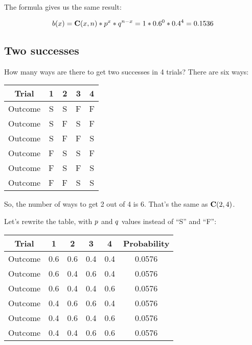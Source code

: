 \documentclass[../../../main.tex]{subfiles}
\begin{document}
The formula gives us the same result:

\begin{equation*}
  \Binom{\RandVarVal/} = \combs{\RandVarVal/}{n} * p^{\RandVarVal/} * q^{n - \RandVarVal/} = 1 * 0.6^{0} * 0.4^{4} = 0.1536
\end{equation*}


\subsection{Two successes}

How many ways are there to get two successes in 4 trials? There are six ways:

\begin{center}
  \begin{tabular}{| c | c | c | c | c |}
    \hline
    \textbf{Trial} & \textbf{1} & \textbf{2} & \textbf{3} & \textbf{4} \\ \hline
  Outcome & S & S & F & F \\ \hline
  Outcome & S & F & S & F \\ \hline
  Outcome & S & F & F & S \\ \hline
  Outcome & F & S & S & F \\ \hline
  Outcome & F & S & F & S \\ \hline
  Outcome & F & F & S & S \\ \hline
  \end{tabular}
\end{center}

\noindent
So, the number of ways to get 2 out of 4 is 6. That's the same as $\mathbf{C}(2, 4)$. 

Let's rewrite the table, with $\success/$ and $\failure/$ values instead of ``S'' and ``F'':

\begin{center}
  \begin{tabular}{| c | c | c | c | c | c |}
    \hline
    \textbf{Trial} & \textbf{1} & \textbf{2} & \textbf{3} & \textbf{4} & \textbf{Probability} \\ \hline
  Outcome & 0.6 & 0.6 & 0.4 & 0.4 & 0.0576 \\ \hline
  Outcome & 0.6 & 0.4 & 0.6 & 0.4 & 0.0576 \\ \hline
  Outcome & 0.6 & 0.4 & 0.4 & 0.6 & 0.0576 \\ \hline
  Outcome & 0.4 & 0.6 & 0.6 & 0.4 & 0.0576 \\ \hline
  Outcome & 0.4 & 0.6 & 0.4 & 0.6 & 0.0576 \\ \hline
  Outcome & 0.4 & 0.4 & 0.6 & 0.6 & 0.0576 \\ \hline
  \end{tabular}
\end{center}
\end{document}
